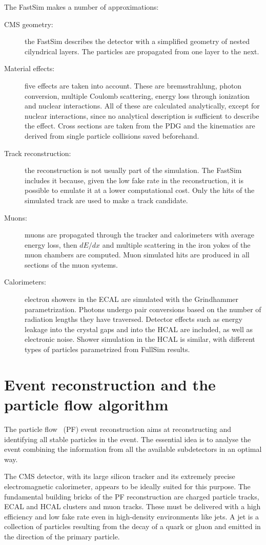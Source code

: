 The FastSim makes a number of approximations:
\begin{description}
    \item[CMS geometry:] the FastSim describes the detector with a simplified geometry of nested cilyndrical layers. The particles are propagated from one layer to the next.
    \item[Material effects:] five effects are taken into account. These are bremsstrahlung, photon conversion, multiple Coulomb scattering, energy loss through ionization and nuclear interactions. All of these are calculated analytically, except for nuclear interactions, since no analytical description is sufficient to describe the effect. Cross sections are taken from the PDG and the kinematics are derived from single particle collisions saved beforehand.
    \item[Track reconstruction:] the reconstruction is not usually part of the simulation. The FastSim includes it because, given the low fake rate in the reconstruction, it is possible to emulate it at a lower computational cost. Only the hits of the simulated track are used to make a track candidate. 
    \item[Muons:] muons are propagated through the tracker and calorimeters with average energy loss, then $dE/dx$ and multiple scattering in the iron yokes of the muon chambers are computed. Muon simulated hits are produced in all sections of the muon systems.
    \item[Calorimeters:] electron showers in the ECAL are simulated with the Grindhammer~\cite{fs:grindhammer} parametrization. Photons undergo pair conversions based on the number of radiation lengths they have traversed. Detector effects such as energy leakage into the crystal gaps and into the HCAL are included, as well as electronic noise. Shower simulation in the HCAL is similar, with different types of particles parametrized from FullSim results.
\end{description}

\section{Event reconstruction and the particle flow algorithm}
The particle flow~\cite{pf:particle.flow} (PF) event reconstruction aims at reconstructing and identifying all stable particles in the event. The essential idea is to analyse the event combining the information from all the available subdetectors in an optimal way.

The CMS detector, with its large silicon tracker and its extremely precise electromagnetic calorimeter, appears to be ideally suited for this purpose. The fundamental building bricks of the PF reconstruction are charged particle tracks, ECAL and HCAL clusters and muon tracks. These must be delivered with a high efficiency and low fake rate even in high-density environments like jets. A jet is a collection of particles resulting from the decay of a quark or gluon and emitted in the direction of the primary particle. 

